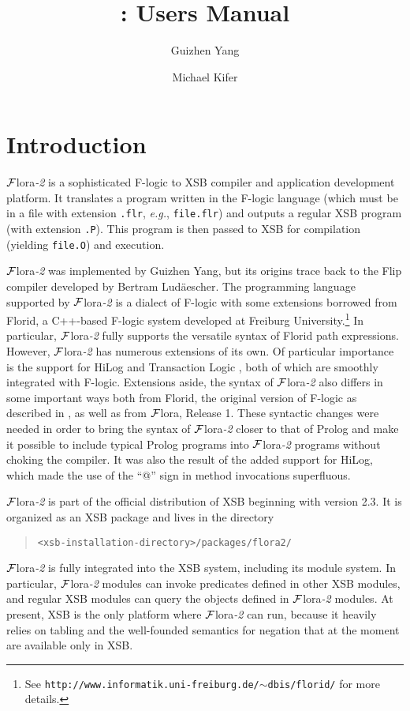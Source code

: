 \documentclass[11pt]{article}
\title{\FLORA: Users Manual}
\author{
  Guizhen Yang
  \and
  Michael Kifer
  }
\newcommand{\FLIP}{{\mbox{\sc Flip}}\xspace}
\newcommand{\FLORA}{{\mbox{${\cal F}${\sc lora}\rm\emph{-2}}}\xspace}
\newcommand{\FLORAone}{{\mbox{${\cal F}${\sc lora}}}\xspace}
\newcommand{\FLORID}{{\mbox{\sc Florid}}\xspace}
\newcommand{\fl}{\mbox{F-logic}\xspace}
\begin{document}
\maketitle
\thispagestyle{empty}

\newpage
{}
\setcounter{page}{1}

\tableofcontents

\newpage

\setcounter{page}{1}


\section{Introduction}

\FLORA is a sophisticated \fl to XSB compiler and application
development platform. It translates a program written in the \fl
language \cite{KLW95} (which must be in a file with extension {\tt .flr},
{\it e.g.}, {\tt file.flr}) and outputs a regular XSB program (with
extension {\tt .P}). This program is
then passed to XSB for compilation (yielding {\tt file.O}) and execution.

\FLORA was implemented by Guizhen Yang, but its origins trace back to the
\FLIP compiler developed by Bertram Lud\"aescher.  The programming language
supported by \FLORA is a dialect of \fl with some extensions borrowed
from \FLORID, a C++-based \fl system developed at Freiburg
University.\footnote{
  See {\tt http://www.informatik.uni-freiburg.de/$\sim$dbis/florid/} for more
  details.
  }
In particular, \FLORA fully supports the versatile syntax of \FLORID path
expressions. However, \FLORA has numerous extensions of its own.  Of
particular importance is the support for HiLog \cite{hilog-jlp} and
Transaction Logic \cite{trans-dbpl93,trans-iclp93,trans-tcs94}, both of
which are smoothly integrated with \fl. Extensions aside, the syntax of
\FLORA also differs in some important ways both from \FLORID, the original
version of \fl as described in \cite{KLW95}, as well as from \FLORAone,
Release 1. These syntactic changes were needed in order to bring the syntax
of \FLORA closer to that of Prolog and make it possible to include typical
Prolog programs into \FLORA programs without choking the compiler.
It was also the result of the added support for HiLog, which made the use
of the ``@'' sign in method invocations superfluous.

\FLORA is part of the official distribution of XSB beginning with version
2.3. It is organized as an XSB package and lives in the directory
\begin{quote}
 \verb|<xsb-installation-directory>/packages/flora2/|  
\end{quote}
\FLORA is fully integrated into the XSB system, including its module
system. In particular, \FLORA modules can invoke predicates defined in
other XSB modules, and regular XSB modules can query the objects defined in
\FLORA modules. At present, XSB is the only platform where \FLORA can run,
because it heavily relies on tabling and the well-founded semantics for
negation that at the moment are available only in XSB.
\end{document}
